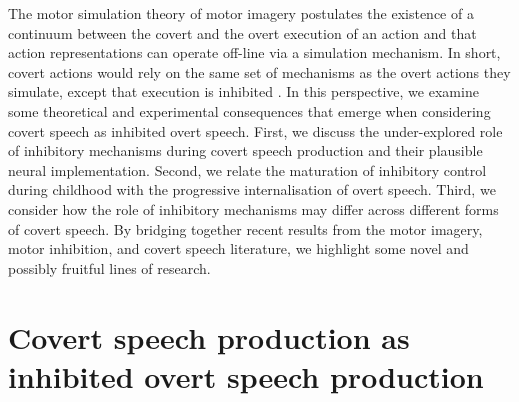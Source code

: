 \documentclass[utf8]{template/frontiersSCNS} %
\begin{document}

The motor simulation theory \citep{jeannerod_origin_2006, jeannerod_representing_1994, jeannerod_neural_2001} of motor imagery postulates the existence of a continuum between the covert and the overt execution of an action and that action representations can operate off-line via a simulation mechanism. In short, covert actions would rely on the same set of mechanisms as the overt actions they simulate, except that execution is inhibited \citep{oshea_does_2017}. In this perspective, we examine some theoretical and experimental consequences that emerge when considering covert speech as inhibited overt speech. First, we discuss the under-explored role of inhibitory mechanisms during covert speech production and their plausible neural implementation. Second, we relate the maturation of inhibitory control during childhood with the progressive internalisation of overt speech. Third, we consider how the role of inhibitory mechanisms may differ across different forms of covert speech. By bridging together recent results from the motor imagery, motor inhibition, and covert speech literature, we highlight some novel and possibly fruitful lines of research.

\section{Covert speech production as inhibited overt speech production}
\end{document}
